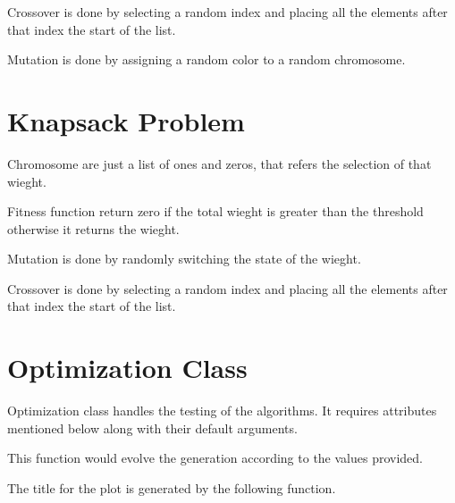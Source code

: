 \documentclass[12pt]{report}
\theoremstyle{mytheoremstyle}
\theoremstyle{mytheoremstyle}
\theoremstyle{myproblemstyle}
\begin{document}
\newpage

Crossover is done by selecting a random index and placing all the elements after that index the start of the list.

Mutation is done by assigning a random color to a random chromosome.


\newpage

\section{Knapsack Problem}
Chromosome are just a list of ones and zeros, that refers the selection of that wieght.

Fitness function return zero if the total wieght is greater than the threshold otherwise it returns the wieght.


\newpage

Mutation is done by randomly switching the state of the wieght.

Crossover is done by selecting a random index and placing all the elements after that index the start of the list.


\newpage

\section{Optimization Class}
Optimization class handles the testing of the algorithms. It requires attributes mentioned below along with their default arguments.


\newpage

This function would evolve the generation according to the values provided.

The title for the plot is generated by the following function.

\end{document}
